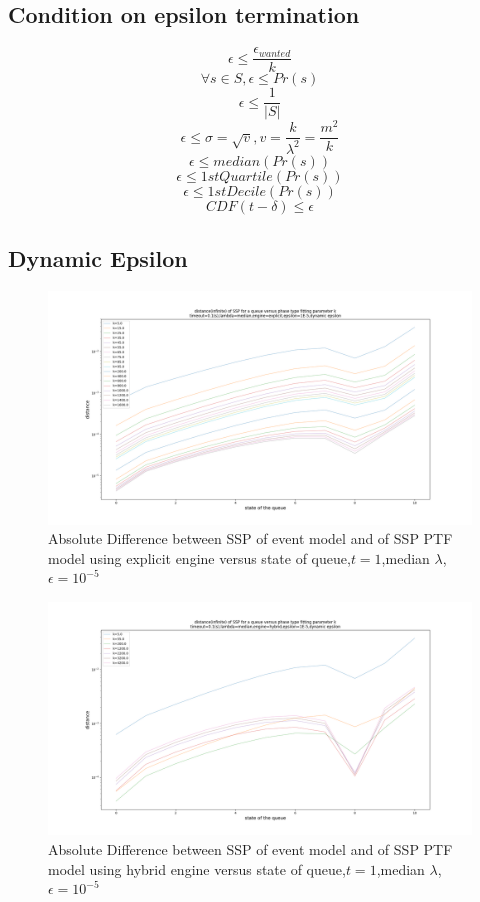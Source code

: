 \documentclass[paper=a4, fontsize=11pt]{scrartcl}
\numberwithin{equation}{section}		%
\numberwithin{figure}{section}			%
\numberwithin{table}{section}				%
\begin{document}
\clearpage
\subsection[epsilon termination]{Condition on epsilon termination}
$$\epsilon \leq \frac{\epsilon_{wanted}}{k}$$
$$\forall s \in S, \epsilon \leq Pr(s)$$
$$\epsilon \leq \frac{1}{|S|}$$
$$\epsilon \leq \sigma = \sqrt{v}, v = \frac{k}{\lambda^2} = \frac{m^2}{k}$$
$$\epsilon \leq median(Pr(s))$$
$$\epsilon \leq 1stQuartile(Pr(s))$$
$$\epsilon \leq 1stDecile(Pr(s))$$
$$CDF(t-\delta) \leq \epsilon$$

\clearpage
\subsection[epsilon termination]{Dynamic Epsilon}


\begin{figure}
	\centering
	\includegraphics[width=17cm]{picture/New_model/distance_explicit_dynamic.png}
	\caption{Absolute Difference between SSP of event model and of SSP PTF model using explicit engine versus state of queue,$t=1$,median $\lambda$,$\epsilon=10^{-5}$}
	\label{fig:dist_dynamic_explicit}
\end{figure}	

\begin{figure}
	\centering
	\includegraphics[width=17cm]{picture/New_model/distance_hybrid_dynamic.png}
	\caption{Absolute Difference between SSP of event model and of SSP PTF model using hybrid engine versus state of queue,$t=1$,median $\lambda$,$\epsilon=10^{-5}$}
	\label{fig:dist_dynamic_hybrid}
\end{figure}

\end{document}
